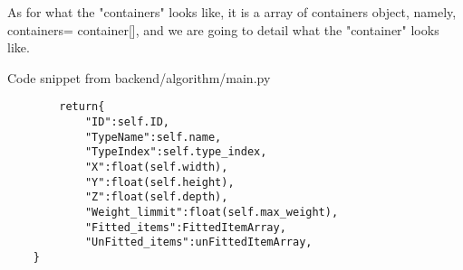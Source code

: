 \documentclass{article}
\begin{document}
\newpage


As for what the "containers" looks like, it is a array of containers object, namely, containers= container[], and we are going to detail what the "container" looks like.
\caption{Code snippet from backend/algorithm/main.py}
\begin{mdframed}[backgroundcolor=bg]
\begin{verbatim}
        return{
            "ID":self.ID,
            "TypeName":self.name,
            "TypeIndex":self.type_index,
            "X":float(self.width),
            "Y":float(self.height),
            "Z":float(self.depth),
            "Weight_limmit":float(self.max_weight),
            "Fitted_items":FittedItemArray,
            "UnFitted_items":unFittedItemArray,
    }
\end{verbatim}
\end{mdframed}
\end{document}
